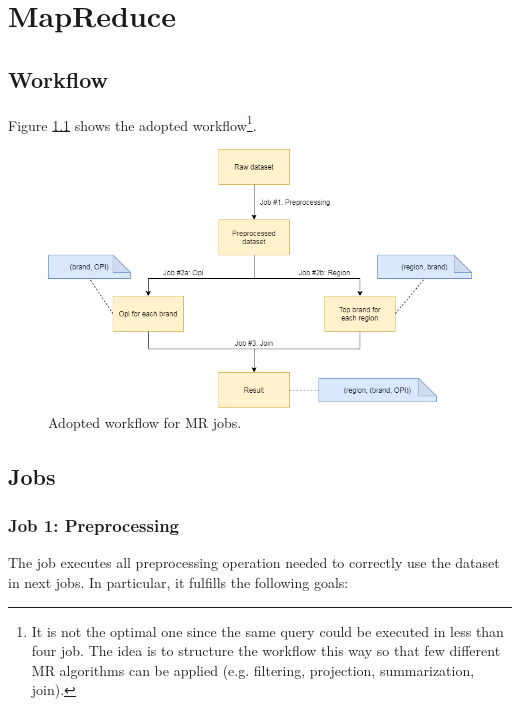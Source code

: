 \chapter{MapReduce}

\section{Workflow}

Figure \ref{fig:MR-workflow} shows the adopted workflow\footnote{It is not the optimal one since the same query could be executed in less than four job. The idea is to structure the workflow this way so that few different MR algorithms can be applied (e.g. filtering, projection, summarization, join). }.

\begin{figure}[H]
	\centering
	\includegraphics[scale=0.6]{images/2-mapreduce/MR-workflow.png}
	\caption{Adopted workflow for MR jobs.}
	\label{fig:MR-workflow}
\end{figure}

\section{Jobs}

\subsection{Job 1: Preprocessing}

The job executes all preprocessing operation needed to correctly use the dataset in next jobs. In particular, it fulfills the following goals:

